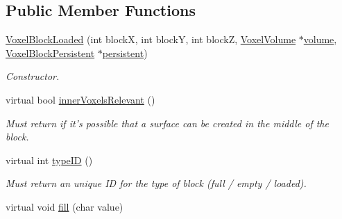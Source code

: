 \subsection*{\-Public \-Member \-Functions}
\begin{DoxyCompactItemize}
\item 
\hypertarget{classVoxelBlockLoaded_afc35c39898f806e5a40ce6348168c108}{
\hyperlink{classVoxelBlockLoaded_afc35c39898f806e5a40ce6348168c108}{\-Voxel\-Block\-Loaded} (int block\-X, int block\-Y, int block\-Z, \hyperlink{classVoxelVolume}{\-Voxel\-Volume} $\ast$\hyperlink{classVoxelBlock_aa8398251c9d5d3ba466e8993bcb6eb38}{volume}, \hyperlink{classVoxelBlockPersistent}{\-Voxel\-Block\-Persistent} $\ast$\hyperlink{classVoxelBlock_ad9d2e2c26398379b6a92e2e5ea4ab20d}{persistent})}
\label{d0/df8/classVoxelBlockLoaded_afc35c39898f806e5a40ce6348168c108}

\begin{DoxyCompactList}\small\item\em \-Constructor. \end{DoxyCompactList}\item 
\hypertarget{classVoxelBlockLoaded_a2c0a021b86f70dea2b9e493c1f3548bc}{
virtual bool \hyperlink{classVoxelBlockLoaded_a2c0a021b86f70dea2b9e493c1f3548bc}{inner\-Voxels\-Relevant} ()}
\label{d0/df8/classVoxelBlockLoaded_a2c0a021b86f70dea2b9e493c1f3548bc}

\begin{DoxyCompactList}\small\item\em \-Must return if it's possible that a surface can be created in the middle of the block. \end{DoxyCompactList}\item 
\hypertarget{classVoxelBlockLoaded_a628f6108d4d2c8106ea881043fe71de7}{
virtual int \hyperlink{classVoxelBlockLoaded_a628f6108d4d2c8106ea881043fe71de7}{type\-I\-D} ()}
\label{d0/df8/classVoxelBlockLoaded_a628f6108d4d2c8106ea881043fe71de7}

\begin{DoxyCompactList}\small\item\em \-Must return an unique \-I\-D for the type of block (full / empty / loaded). \end{DoxyCompactList}\item 
\hypertarget{classVoxelBlockLoaded_ab211d4e87e15205691ec73c47cb6a11a}{
virtual void \hyperlink{classVoxelBlockLoaded_ab211d4e87e15205691ec73c47cb6a11a}{fill} (char value)}
\label{d0/df8/classVoxelBlockLoaded_ab211d4e87e15205691ec73c47cb6a11a}


\end{DoxyCompactItemize}
